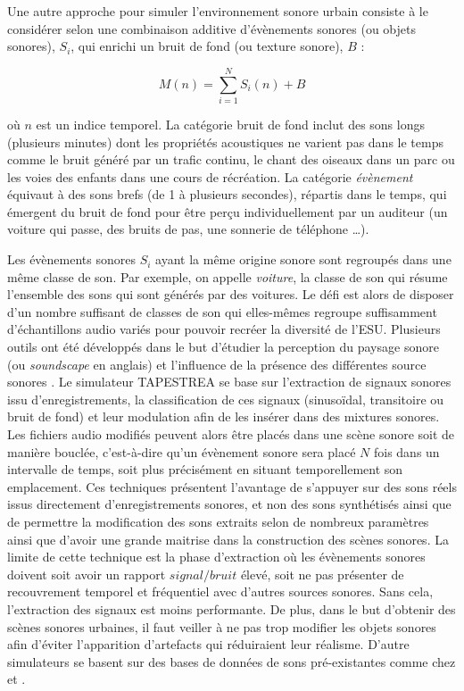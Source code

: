 Une autre approche pour simuler l'environnement sonore urbain consiste à le considérer selon une combinaison additive d'évènements sonores (ou objets sonores), $S_i$, qui enrichi un bruit de fond (ou texture  sonore), $B$ \cite{nelken2013ear} :

\begin{equation}
M(n) = \sum_{i = 1}^{N} S_i(n) + B
\end{equation}

où $n$ est un indice temporel.
La catégorie bruit de fond inclut des sons longs (plusieurs minutes) dont les propriétés acoustiques ne varient pas dans le temps comme le bruit généré par un trafic continu, le chant des oiseaux dans un parc ou les voies des enfants dans une cours de récréation.
La catégorie \textit{évènement} équivaut à des sons brefs (de 1 à plusieurs secondes), répartis dans le temps, qui émergent du bruit de fond pour être perçu individuellement par un auditeur (un voiture qui passe, des bruits de pas, une sonnerie de téléphone \dots). 

Les évènements sonores $S_i$ ayant la même origine sonore sont regroupés dans une même classe de son. Par exemple, on appelle \textit{voiture}, la classe de son qui résume l'ensemble des sons qui sont générés par des voitures. 
Le défi est alors de disposer d'un nombre suffisant de classes de son qui elles-mêmes regroupe suffisamment d'échantillons audio variés pour pouvoir recréer la diversité de l'ESU. Plusieurs outils ont été développés dans le but d'étudier la perception du paysage sonore (ou \textit{soundscape} en anglais) et l'influence de la présence des différentes source sonores \cite{valle2009framework, finney2010soundscape}. Le simulateur TAPESTREA \cite{misra_musical_2007} se base sur l'extraction de signaux sonores issu d'enregistrements, la classification de ces signaux (sinusoïdal, transitoire ou bruit de fond) et leur modulation afin de les insérer dans des mixtures sonores. Les fichiers audio modifiés peuvent alors être placés dans une scène sonore soit de manière bouclée, c'est-à-dire qu'un évènement sonore sera placé $N$ fois dans un intervalle de temps, soit plus précisément en situant temporellement son emplacement.
Ces techniques présentent l'avantage de s'appuyer sur des sons réels issus directement d'enregistrements sonores, et non des sons synthétisés ainsi que de permettre la modification des sons extraits selon de nombreux paramètres ainsi que d'avoir une grande maitrise dans la construction des scènes sonores. La limite de cette technique est la phase d'extraction où les évènements sonores doivent soit avoir un rapport $signal/bruit$ élevé, soit ne pas présenter de recouvrement temporel et fréquentiel avec d'autres sources sonores. Sans cela, l'extraction des signaux est moins performante. De plus, dans le but d'obtenir des scènes sonores urbaines, il faut veiller à ne pas trop modifier les objets sonores afin d'éviter l'apparition d'artefacts qui réduiraient leur réalisme.
D'autre simulateurs se basent sur des bases de données de sons pré-existantes comme chez \cite{bruce_development_2009} et \cite{rossignol_simscene_2015}.

